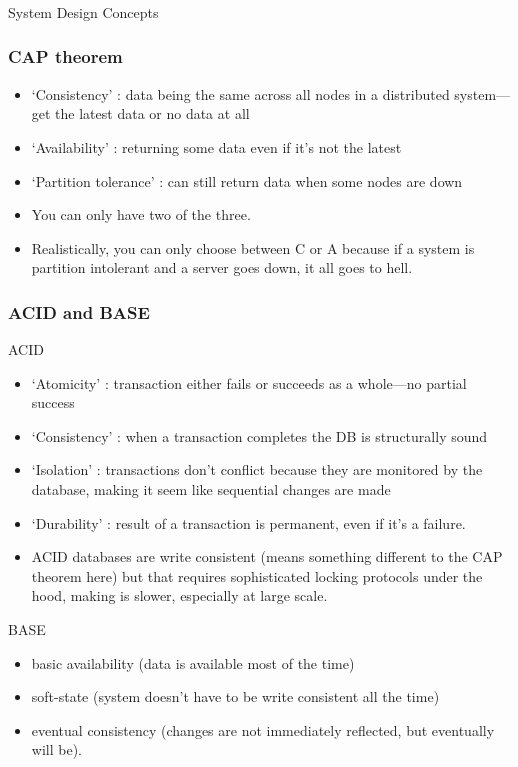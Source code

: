 \begin{frame}[fragile]\frametitle{}
\begin{center}
{\Large System Design Concepts}
\end{center}

\end{frame}

\begin{frame}
	\frametitle{CAP theorem}
		
			\begin{itemize}
				\item  `Consistency' : data being the same across all nodes in a distributed system—get the latest data or no data at all
				\item `Availability' : returning some data even if it’s not the latest
				\item `Partition tolerance' : can still return data when some nodes are down
				\item You can only have two of the three. 
				\item Realistically, you can only choose between C or A because if a system is partition intolerant and a server goes down, it all goes to hell. 
			\end{itemize}
\end{frame}

\begin{frame}
	\frametitle{ACID and BASE}
		ACID
			\begin{itemize}
				\item `Atomicity' : transaction either fails or succeeds as a whole—no partial success
				\item `Consistency' : when a transaction completes the DB is structurally sound
				\item `Isolation' : transactions don’t conflict because they are monitored by the database, making it seem like sequential changes are made
				\item `Durability' : result of a transaction is permanent, even if it’s a failure. 
				\item ACID databases are write consistent (means something different to the CAP 
theorem here) but that requires sophisticated locking protocols under the hood, making is slower, 
especially at large scale. 
			\end{itemize}
		BASE
			\begin{itemize}
				\item basic availability (data is available most of the time)
				\item soft-state (system doesn’t have to be write consistent all the time)
				\item eventual consistency (changes are not immediately reflected, but 
eventually will be). 
			\end{itemize}		
\end{frame}

